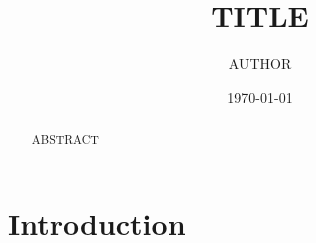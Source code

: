 \documentclass[10pt,a4paper]{amsart}
\theoremstyle{plain}
\theoremstyle{definition}
\theoremstyle{remark}
\begin{document}

\title{{{TITLE}}}
\author{{{AUTHOR}}}
\address{}
\date{\today}

\begin{abstract}
{{ABSTRACT}}
\end{abstract}

\maketitle
\tableofcontents

\section{Introduction}\label{sec:intro}






\end{document}

